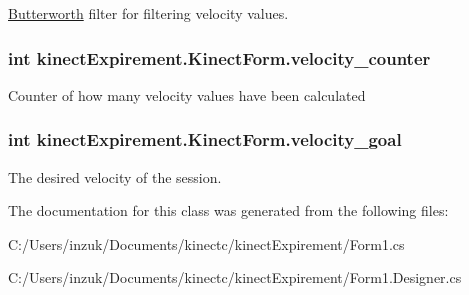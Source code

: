 \hyperlink{classkinect_expirement_1_1_butterworth}{Butterworth} filter for filtering velocity values. 

\subsubsection[{\texorpdfstring{velocity\+\_\+counter}{velocity_counter}}]{\setlength{\rightskip}{0pt plus 5cm}int kinect\+Expirement.\+Kinect\+Form.\+velocity\+\_\+counter}\hypertarget{classkinect_expirement_1_1_kinect_form_aedd93118198e798ee966ff768038bac1}{}\label{classkinect_expirement_1_1_kinect_form_aedd93118198e798ee966ff768038bac1}


Counter of how many velocity values have been calculated 

\subsubsection[{\texorpdfstring{velocity\+\_\+goal}{velocity_goal}}]{\setlength{\rightskip}{0pt plus 5cm}int kinect\+Expirement.\+Kinect\+Form.\+velocity\+\_\+goal}\hypertarget{classkinect_expirement_1_1_kinect_form_a6334825924ef2914544c0c96c0ad0572}{}\label{classkinect_expirement_1_1_kinect_form_a6334825924ef2914544c0c96c0ad0572}


The desired velocity of the session. 



The documentation for this class was generated from the following files\+:\begin{DoxyCompactItemize}
\item 
C\+:/\+Users/inzuk/\+Documents/kinectc/kinect\+Expirement/Form1.\+cs\item 
C\+:/\+Users/inzuk/\+Documents/kinectc/kinect\+Expirement/Form1.\+Designer.\+cs\end{DoxyCompactItemize}
